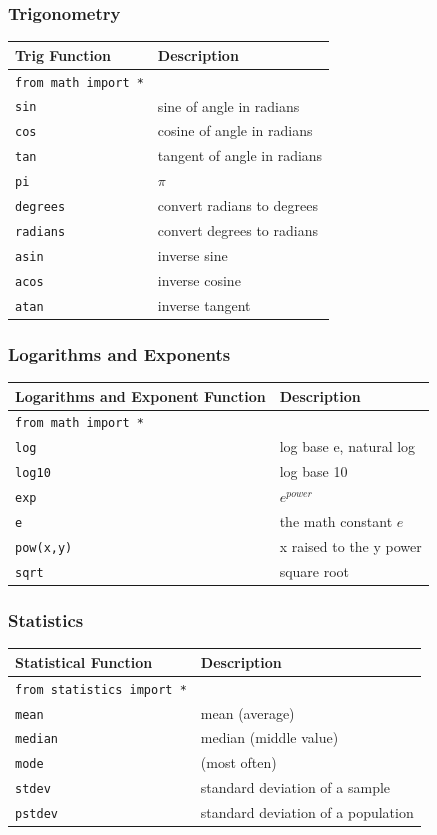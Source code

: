 \documentclass{book}
\begin{document}
\subsubsection{Trigonometry}\label{trigonometry}

\begin{longtable}[]{@{}ll@{}}
\toprule
Trig Function & Description\tabularnewline
\midrule
\endhead
\lstinline!from math import *! &\tabularnewline
\lstinline!sin! & sine of angle in radians\tabularnewline
\lstinline!cos! & cosine of angle in radians\tabularnewline
\lstinline!tan! & tangent of angle in radians\tabularnewline
\lstinline!pi! & \(\pi\)\tabularnewline
\lstinline!degrees! & convert radians to degrees\tabularnewline
\lstinline!radians! & convert degrees to radians\tabularnewline
\lstinline!asin! & inverse sine\tabularnewline
\lstinline!acos! & inverse cosine\tabularnewline
\lstinline!atan! & inverse tangent\tabularnewline
\bottomrule
\end{longtable}

\subsubsection{Logarithms and Exponents}\label{logarithms-and-exponents}

\begin{longtable}[]{@{}ll@{}}
\toprule
Logarithms and Exponent Function & Description\tabularnewline
\midrule
\endhead
\lstinline!from math import *! &\tabularnewline
\lstinline!log! & log base e, natural log\tabularnewline
\lstinline!log10! & log base 10\tabularnewline
\lstinline!exp! & \(e^{power}\)\tabularnewline
\lstinline!e! & the math constant \(e\)\tabularnewline
\lstinline!pow(x,y)! & x raised to the y power\tabularnewline
\lstinline!sqrt! & square root\tabularnewline
\bottomrule
\end{longtable}

\subsubsection{Statistics}\label{statistics}

\begin{longtable}[]{@{}ll@{}}
\toprule
Statistical Function & Description\tabularnewline
\midrule
\endhead
\lstinline!from statistics import *! &\tabularnewline
\lstinline!mean! & mean (average)\tabularnewline
\lstinline!median! & median (middle value)\tabularnewline
\lstinline!mode! & (most often)\tabularnewline
\lstinline!stdev! & standard deviation of a sample\tabularnewline
\lstinline!pstdev! & standard deviation of a population\tabularnewline
\bottomrule
\end{longtable}
    
\end{document}

